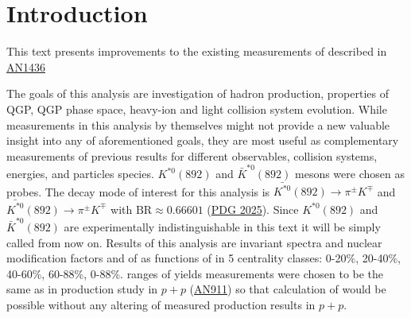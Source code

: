 \section{Introduction}

This text presents improvements to the existing measurements of \Kstar described in \href{https://phenix-intra.sdcc.bnl.gov/phenix/WWW/p/draft/vborisov/Kstar_production_in_HeAu200_1.pdf}{AN1436}

The goals of this analysis are investigation of hadron production, properties of QGP, QGP phase space, heavy-ion and light collision system evolution.
While measurements in this analysis by themselves might not provide a new valuable insight into any of aforementioned goals, they are most useful as complementary measurements of previous results for different observables, collision systems, energies, and particles species.
$K^{*0}(892)$ and $\bar{K}^{*0}(892)$ mesons were chosen as probes. 
The decay mode of interest for this analysis is $\bar{K^{*0}}(892) \rightarrow \pi^\pm K^\mp$ and $\bar{K^{*0}}(892) \rightarrow \pi^\pm K^\mp$ with $\text{BR} \approx 0.66601$ (\href{https://pdg.lbl.gov/2025/web/viewer.html?file=../listings/rpp2025-list-K-star-892.pdf}{PDG 2025}). 
Since $K^{*0}(892)$ and $\bar{K}^{*0}(892)$ are experimentally indistinguishable in this text it will be simply called \Kstar from now on. Results of this analysis are invariant \pt spectra and nuclear modification factors \rab and \rcp of \Kstar as functions of \pt in 5 centrality classes: 0-20\%, 20-40\%, 40-60\%, 60-88\%, 0-88\%. 
\pt ranges of yields measurements were chosen to be the same as in \Kstar production study in $p+p$ (\href{https://phenix-intra.sdcc.bnl.gov/phenix/WWW/p/draft/pshukla/AnaKstarNew/anaKstar5.pdf}{AN911}) so that calculation of \rab would be possible without any altering of measured \Kstar production results in $p+p$.
